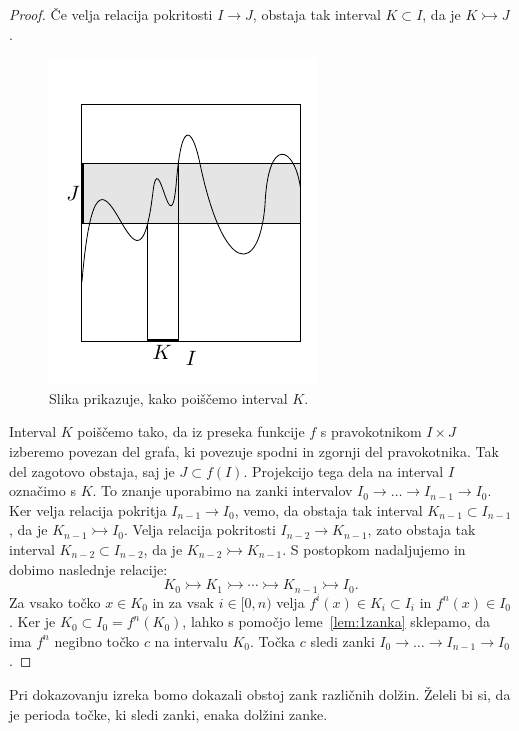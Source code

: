 \documentclass[mat2]{fmfdelo}
\begin{document}
\begin{proof}
Če velja relacija pokritosti $I \to J$, obstaja tak interval $K \subset I$, da je $K \rightarrowtail J$.
\begin{figure}[h]
  \centering
  \includegraphics[]{images/bezje.pdf}
  \caption[Primer vektorske slike.]{Slika prikazuje, kako poiščemo interval $K$.}
  \label{fig:bezje}
\end{figure}
Interval $K$ poiščemo tako, da iz preseka funkcije $f$ s pravokotnikom $I \times J$ izberemo povezan del grafa, ki povezuje spodni in zgornji del pravokotnika. Tak del zagotovo obstaja, saj je $J \subset f(I)$. Projekcijo tega dela na interval $I$ označimo s $K$. To znanje uporabimo na zanki intervalov $I_0 \to \dots \to I_{n-1} \to I_0$. Ker velja relacija pokritja $I_{n-1} \to I_0$, vemo, da obstaja tak interval $K_{n-1} \subset I_{n-1}$, da je $K_{n-1} \rightarrowtail I_0$. Velja relacija pokritosti $I_{n-2} \to K_{n-1}$, zato obstaja tak interval $K_{n-2} \subset I_{n-2}$, da je $K_{n-2} \rightarrowtail K_{n-1}$. S postopkom nadaljujemo in dobimo naslednje relacije:
$$K_0 \rightarrowtail K_1 \rightarrowtail \cdots \rightarrowtail K_{n-1} \rightarrowtail I_0.$$
Za vsako točko $x \in K_0$ in za vsak $i \in [0, n)$ velja $f^i(x) \in K_i \subset I_i$ in $f^n(x) \in I_0$. Ker je $K_0 \subset I_0 = f^n(K_0)$, lahko s pomočjo leme~\ref{lem:1zanka} sklepamo, da ima $f^n$ negibno točko $c$ na intervalu $K_0$. Točka $c$ sledi zanki $I_0 \to \dots \to I_{n-1} \to I_0$.
\end{proof}

Pri dokazovanju izreka bomo dokazali obstoj zank različnih dolžin. Želeli bi si, da je perioda točke, ki sledi zanki, enaka dolžini zanke. 
\end{document}
